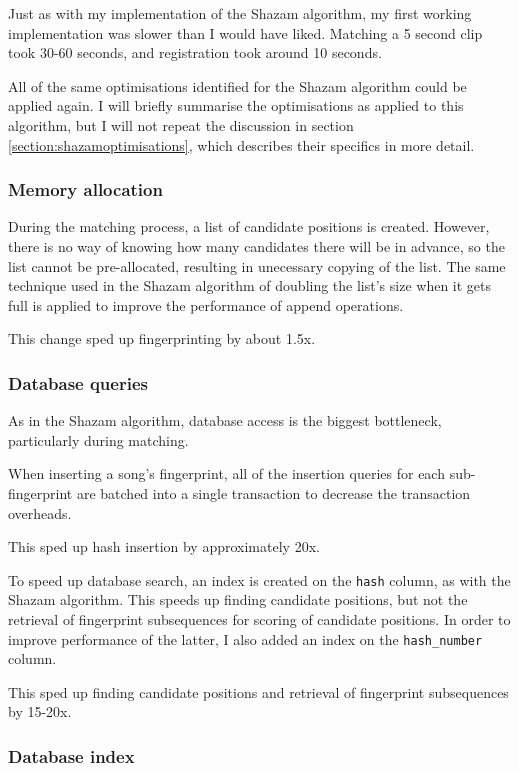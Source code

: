 \documentclass[12pt,a4paper,twoside,openright]{report}
\begin{document}
Just as with my implementation of the Shazam algorithm, my first working implementation was slower than I would have liked. Matching a 5 second clip took 30-60 seconds, and registration took around 10 seconds. 

All of the same optimisations identified for the Shazam algorithm could be applied again. I will briefly summarise the optimisations as applied to this algorithm, but I will not repeat the discussion in section \ref{section:shazamoptimisations}, which describes their specifics in more detail.


\subsubsection{Memory allocation}

During the matching process, a list of candidate positions is created. However, there is no way of knowing how many candidates there will be in advance, so the list cannot be pre-allocated, resulting in unecessary copying of the list. The same technique used in the Shazam algorithm of doubling the list's size when it gets full is applied to improve the performance of append operations.

This change sped up fingerprinting by about 1.5x.

\subsubsection{Database queries}

As in the Shazam algorithm, database access is the biggest bottleneck, particularly during matching.

When inserting a song's fingerprint, all of the insertion queries for each sub-fingerprint are batched into a single transaction to decrease the transaction overheads.

This sped up hash insertion by approximately 20x.

To speed up database search, an index is created on the \lstinline{hash} column, as with the Shazam algorithm. This speeds up finding candidate positions, but not the retrieval of fingerprint subsequences for scoring of candidate positions. In order to improve performance of the latter, I also added an index on the \lstinline{hash_number} column.

This sped up finding candidate positions and retrieval of fingerprint subsequences by 15-20x.


\subsubsection{Database index}
\end{document}
